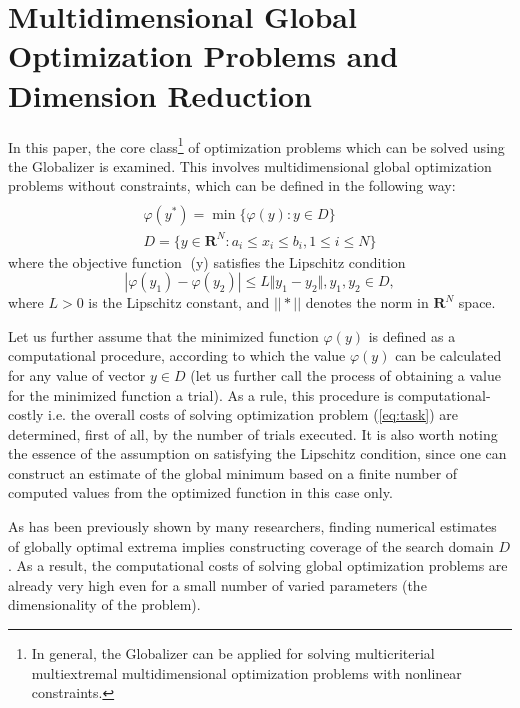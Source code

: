 \documentclass{gOMS2e}
\theoremstyle{plain}%
\theoremstyle{definition}
\theoremstyle{remark}
\begin{document}
\section{Multidimensional Global Optimization Problems and Dimension Reduction}
\label{sec:problem}
In this paper, the core class\footnote{In general, the Globalizer can be applied for solving
multicriterial multiextremal multidimensional optimization problems with nonlinear constraints.} of
optimization problems which can be solved using the
Globalizer is examined. This involves multidimensional global optimization problems
without constraints, which can be defined in the following way:
\begin{equation}
\label{eq:task}
\begin{array}{cr}\\
  \varphi(y^*)=\min\{\varphi(y):y\in D\} \\
  D=\{y\in \mathbf{R}^N:a_i\leqslant x_i\leqslant{b_i}, 1\leqslant{i}\leqslant{N}\}
\end{array}
\end{equation}
where the objective function (y) satisfies the Lipschitz condition
\begin{equation}
\label{eq:lip}
|\varphi(y_1)-\varphi(y_2)|\leqslant L\Vert y_1-y_2\Vert,y_1,y_2\in D,
\end{equation}
where \(L>0\) is the Lipschitz constant, and \(||*||\) denotes the norm in \(\mathbf{R}^N\) space.
\par
Let us further assume that the minimized function \(\varphi(y)\) is defined as a
computational procedure, according to which the value \(\varphi(y)\) can be calculated
for any value of vector \(y\in D\) (let us further call the process of obtaining a
value for the minimized function a trial). As a rule, this procedure is computational-costly i.e.
the overall costs of solving optimization problem (\ref{eq:task}) are determined,
first of all, by the number of trials executed. It is also worth noting the essence of the
assumption on satisfying the Lipschitz condition, since one can construct an estimate
of the global minimum based on a finite number of computed values from the optimized function in this case only.
\par
As has been previously shown by many researchers, finding numerical estimates of globally
optimal extrema implies constructing coverage of the search domain \(D\). As a result,
the computational costs of solving global optimization problems are already very high
even for a small number of varied parameters (the dimensionality of the problem).
\end{document}
